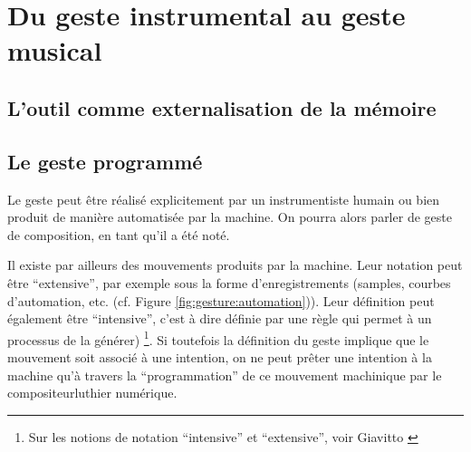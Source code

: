 \section{Du geste instrumental au geste musical}
\label{sec:gesture:instrumental_to_musical}
\subsection{L'outil comme externalisation de la mémoire}
\label{sec:gesture:instrumental_to_musical:externalisation}

\subsection{Le geste programmé}
\label{sec:gesture:instrumental_to_musical:geste_programme}

Le geste peut être réalisé explicitement par un instrumentiste humain ou bien produit de manière automatisée par la machine. On pourra alors parler de geste de composition, en tant qu'il a été noté. 

Il existe par ailleurs des mouvements produits par la machine. Leur notation peut être ``extensive'', par exemple sous la forme d'enregistrements (samples, courbes d'automation, etc. (cf. Figure \ref{fig:gesture:automation})). Leur définition peut également être ``intensive'', c'est à dire définie par une règle qui permet à un processus de la générer) \footnote{Sur les notions de notation ``intensive'' et ``extensive'', voir Giavitto \cite{giavitto_du_2014}}. Si toutefois la définition du geste implique que le mouvement soit associé à une intention, on ne peut prêter une intention à la machine qu'à travers la ``programmation'' de ce mouvement machinique par le compositeur\/luthier numérique.

